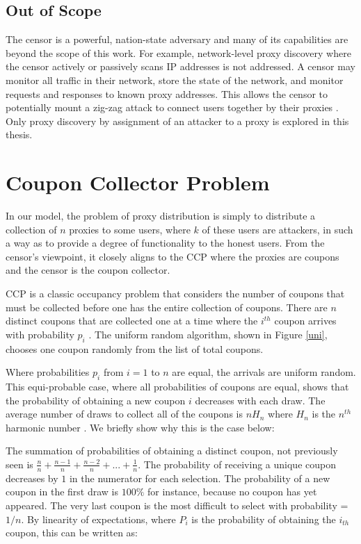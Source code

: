 \subsection{Out of Scope}

The censor is a powerful, nation-state adversary and many of its capabilities are beyond the scope of this work. For example, network-level proxy discovery where the censor actively or passively scans IP addresses is not addressed. A censor may monitor all traffic in their network, store the state of the network, and monitor requests and responses to known proxy addresses. This allows the censor to potentially mount a zig-zag attack to connect users together by their proxies \cite{BRIDGEDISCO:2019}. Only proxy discovery by assignment of an attacker to a proxy is explored in this thesis.

\section{Coupon Collector Problem}

In our model, the problem of proxy distribution is simply to distribute a collection of $n$ proxies to some users, where $k$ of these users are attackers, in such a way as to provide a degree of functionality to the honest users. From the censor's viewpoint, it closely aligns to the \ac{CCP} where the proxies are coupons and the censor is the coupon collector.

\ac{CCP} is a classic occupancy problem that considers the number of coupons that must be collected before one has the entire collection of coupons. There are $n$ distinct coupons that are collected one at a time where the $i^{th}$ coupon arrives with probability $p_i$ \cite{motwani1995randomized}. The uniform random algorithm, shown in Figure \ref{uni}, chooses one coupon randomly from the list of total coupons.

Where probabilities $p_i$ from $i=1$ to $n$ are equal, the arrivals are uniform random. This equi-probable case, where all probabilities of coupons are equal, shows that the probability of obtaining a new coupon $i$ decreases with each draw. The average number of draws to collect all of the coupons is $nH_n$ where $H_n$ is the $n^{th}$ harmonic number \cite{flajolet1992birthday}. We briefly show why this is the case below: 

The summation of probabilities of obtaining a distinct coupon, not previously seen is $\frac{n}{n} + \frac{n-1}{n} + \frac{n-2}{n} + ... + \frac{1}{n}$. The probability of receiving a unique coupon decreases by $1$ in the numerator for each selection. The probability of a new coupon in the first draw is $100\%$ for instance, because no coupon has yet appeared. The very last coupon is the most difficult to select with probability = $1/n$.
By linearity of expectations, where $P_i$ is the probability of obtaining the $i_{th}$ coupon, this can be written as:

